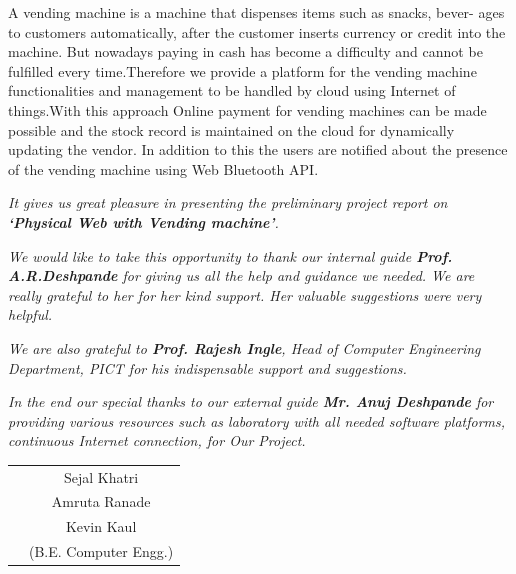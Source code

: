 \documentclass[oneside,a4paper,12pt]{report}
\begin{document}
\newpage

\setcounter{page}{0}
\frontmatter
{}
\rfoot{\thepage}

		
{   \setlength{\parindent}{11mm} }
{ \setlength{\parindent}{0mm} }
 A vending machine is a machine that dispenses items such as snacks, bever-
ages to customers automatically, after the customer inserts currency or credit
into the machine. But nowadays paying in cash has become a difficulty and cannot be fulfilled every time.Therefore we provide a platform for the vending machine functionalities and management to be handled by cloud using Internet of things.With this approach Online payment for vending machines can be made possible and the
stock record is maintained on the cloud for dynamically updating the vendor.
In addition to this the users are notified about the presence of the vending
machine using Web Bluetooth API.


{   \setlength{\parindent}{11mm} }
{ \setlength{\parindent}{0mm} }

\textit{It gives us great pleasure in presenting the preliminary project report 
on {\bfseries \fontsize{12}{12} \selectfont `Physical Web with Vending machine'}.}
\vspace*{1.5\baselineskip}

 \textit{We would like to take this opportunity to thank our internal guide
 \textbf{Prof. A.R.Deshpande} for giving us all the help and guidance we needed. We are really grateful to her for her kind support. Her valuable suggestions were very helpful.} \vspace*{1.5\baselineskip}

 \textit{We are also grateful to \textbf{Prof. Rajesh Ingle}, Head of Computer
 Engineering Department, PICT for his indispensable
 support and suggestions.}
\vspace*{1.5\baselineskip}

\textit{In the end our special thanks to our external guide \textbf{Mr. Anuj Deshpande} for
providing various resources such as  laboratory with all needed software platforms,
continuous Internet connection, for Our Project.}
\vspace*{3\baselineskip} \\
\begin{tabular}{p{8.2cm}c}
&Sejal Khatri\\
&Amruta Ranade\\
&Kevin Kaul\\
&(B.E. Computer Engg.)
\end{tabular}
\end{document}
